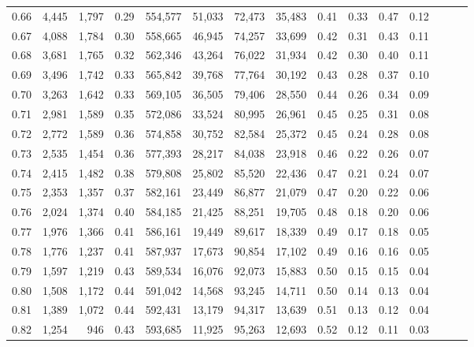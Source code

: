 \begin{tabular}{rrrrrrrrrrrrrrr}
0.66 &   4,445 &  1,797 &  0.29 &  554,577 &   51,033 &   72,473 &   35,483 &  0.41 &  0.33 &  0.47 &      0.12 \\
0.67 &   4,088 &  1,784 &  0.30 &  558,665 &   46,945 &   74,257 &   33,699 &  0.42 &  0.31 &  0.43 &      0.11 \\
0.68 &   3,681 &  1,765 &  0.32 &  562,346 &   43,264 &   76,022 &   31,934 &  0.42 &  0.30 &  0.40 &      0.11 \\
0.69 &   3,496 &  1,742 &  0.33 &  565,842 &   39,768 &   77,764 &   30,192 &  0.43 &  0.28 &  0.37 &      0.10 \\
0.70 &   3,263 &  1,642 &  0.33 &  569,105 &   36,505 &   79,406 &   28,550 &  0.44 &  0.26 &  0.34 &      0.09 \\
0.71 &   2,981 &  1,589 &  0.35 &  572,086 &   33,524 &   80,995 &   26,961 &  0.45 &  0.25 &  0.31 &      0.08 \\
0.72 &   2,772 &  1,589 &  0.36 &  574,858 &   30,752 &   82,584 &   25,372 &  0.45 &  0.24 &  0.28 &      0.08 \\
0.73 &   2,535 &  1,454 &  0.36 &  577,393 &   28,217 &   84,038 &   23,918 &  0.46 &  0.22 &  0.26 &      0.07 \\
0.74 &   2,415 &  1,482 &  0.38 &  579,808 &   25,802 &   85,520 &   22,436 &  0.47 &  0.21 &  0.24 &      0.07 \\
0.75 &   2,353 &  1,357 &  0.37 &  582,161 &   23,449 &   86,877 &   21,079 &  0.47 &  0.20 &  0.22 &      0.06 \\
0.76 &   2,024 &  1,374 &  0.40 &  584,185 &   21,425 &   88,251 &   19,705 &  0.48 &  0.18 &  0.20 &      0.06 \\
0.77 &   1,976 &  1,366 &  0.41 &  586,161 &   19,449 &   89,617 &   18,339 &  0.49 &  0.17 &  0.18 &      0.05 \\
0.78 &   1,776 &  1,237 &  0.41 &  587,937 &   17,673 &   90,854 &   17,102 &  0.49 &  0.16 &  0.16 &      0.05 \\
0.79 &   1,597 &  1,219 &  0.43 &  589,534 &   16,076 &   92,073 &   15,883 &  0.50 &  0.15 &  0.15 &      0.04 \\
0.80 &   1,508 &  1,172 &  0.44 &  591,042 &   14,568 &   93,245 &   14,711 &  0.50 &  0.14 &  0.13 &      0.04 \\
0.81 &   1,389 &  1,072 &  0.44 &  592,431 &   13,179 &   94,317 &   13,639 &  0.51 &  0.13 &  0.12 &      0.04 \\
0.82 &   1,254 &    946 &  0.43 &  593,685 &   11,925 &   95,263 &   12,693 &  0.52 &  0.12 &  0.11 &      0.03 \\

\end{tabular}
